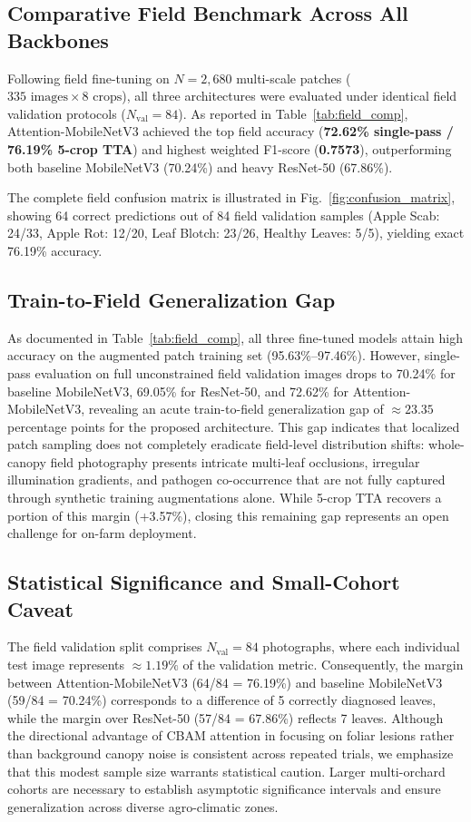 \documentclass[conference]{IEEEtran}
\begin{document}
\subsection{Comparative Field Benchmark Across All Backbones}
Following field fine-tuning on $N = 2,680$ multi-scale patches ($335 \text{ images} \times 8 \text{ crops}$), all three architectures were evaluated under identical field validation protocols ($N_{\text{val}} = 84$). As reported in Table~\ref{tab:field_comp}, Attention-MobileNetV3 achieved the top field accuracy (\textbf{72.62\% single-pass / 76.19\% 5-crop TTA}) and highest weighted F1-score (\textbf{0.7573}), outperforming both baseline MobileNetV3 (70.24\%) and heavy ResNet-50 (67.86\%). 

The complete field confusion matrix is illustrated in Fig.~\ref{fig:confusion_matrix}, showing 64 correct predictions out of 84 field validation samples (Apple Scab: 24/33, Apple Rot: 12/20, Leaf Blotch: 23/26, Healthy Leaves: 5/5), yielding exact 76.19\% accuracy.

\subsection{Train-to-Field Generalization Gap}
As documented in Table~\ref{tab:field_comp}, all three fine-tuned models attain high accuracy on the augmented patch training set (95.63\%--97.46\%). However, single-pass evaluation on full unconstrained field validation images drops to 70.24\% for baseline MobileNetV3, 69.05\% for ResNet-50, and 72.62\% for Attention-MobileNetV3, revealing an acute train-to-field generalization gap of $\approx 23.35$ percentage points for the proposed architecture. This gap indicates that localized patch sampling does not completely eradicate field-level distribution shifts: whole-canopy field photography presents intricate multi-leaf occlusions, irregular illumination gradients, and pathogen co-occurrence that are not fully captured through synthetic training augmentations alone. While 5-crop TTA recovers a portion of this margin (+3.57\%), closing this remaining gap represents an open challenge for on-farm deployment.

\subsection{Statistical Significance and Small-Cohort Caveat}
The field validation split comprises $N_{\text{val}} = 84$ photographs, where each individual test image represents $\approx 1.19\%$ of the validation metric. Consequently, the margin between Attention-MobileNetV3 (64/84 = 76.19\%) and baseline MobileNetV3 (59/84 = 70.24\%) corresponds to a difference of 5 correctly diagnosed leaves, while the margin over ResNet-50 (57/84 = 67.86\%) reflects 7 leaves. Although the directional advantage of CBAM attention in focusing on foliar lesions rather than background canopy noise is consistent across repeated trials, we emphasize that this modest sample size warrants statistical caution. Larger multi-orchard cohorts are necessary to establish asymptotic significance intervals and ensure generalization across diverse agro-climatic zones.
\end{document}
